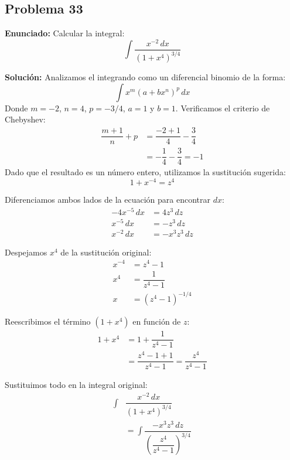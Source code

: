 \subsection*{Problema 33}
\textbf{Enunciado:} Calcular la integral:
\begin{equation*}
\int \dfrac{x^{-2} \, dx}{(1 + x^4)^{3/4}}
\end{equation*}

\textbf{Solución:} Analizamos el integrando
como un diferencial binomio de la forma:
\begin{equation*}
\int x^{m} (a + b x^n)^{p} \, dx
\end{equation*}
Donde $m = -2$, $n = 4$, $p = -3/4$,
$a = 1$ y $b = 1$. Verificamos el
criterio de Chebyshev:
\begin{align*}
\dfrac{m + 1}{n} + p &= \dfrac{-2 + 1}{4} - \dfrac{3}{4} \\
&= -\dfrac{1}{4} - \dfrac{3}{4} = -1
\end{align*}
Dado que el resultado es un número entero,
utilizamos la sustitución sugerida:
\begin{equation*}
1 + x^{-4} = z^4
\end{equation*}

Diferenciamos ambos lados de la
ecuación para encontrar $dx$:
\begin{align*}
-4x^{-5} \, dx &= 4z^3 \, dz \\
x^{-5} \, dx &= -z^3 \, dz \\
x^{-2} \, dx &= -x^3 z^3 \, dz
\end{align*}

Despejamos $x^4$ de la sustitución
original:
\begin{align*}
x^{-4} &= z^4 - 1 \\
x^4 &= \dfrac{1}{z^4 - 1} \\
x &= (z^4 - 1)^{-1/4}
\end{align*}

Reescribimos el término $(1 + x^4)$
en función de $z$:
\begin{align*}
1 + x^4 &= 1 + \dfrac{1}{z^4 - 1} \\
&= \dfrac{z^4 - 1 + 1}{z^4 - 1} = \dfrac{z^4}{z^4 - 1}
\end{align*}

Sustituimos todo en la integral original:
\begin{align*}
\int &\dfrac{x^{-2} \, dx}{(1 + x^4)^{3/4}} \\
&= \int \dfrac{-x^3 z^3 \, dz}{\left(\dfrac{z^4}{z^4 - 1}\right)^{3/4}}
\end{align*}

